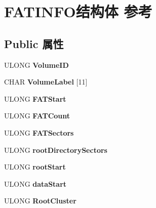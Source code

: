 \hypertarget{struct_f_a_t_i_n_f_o}{}\section{F\+A\+T\+I\+N\+F\+O结构体 参考}
\label{struct_f_a_t_i_n_f_o}
\subsection*{Public 属性}
\begin{DoxyCompactItemize}
\item 
\mbox{\label{struct_f_a_t_i_n_f_o_ad13a5ec5d042ddd8aab39deb6f18c90f}} 
U\+L\+O\+NG {\bfseries Volume\+ID}
\item 
\mbox{\label{struct_f_a_t_i_n_f_o_aa81b74b2d23f8b16c23ee38fb41481e0}} 
C\+H\+AR {\bfseries Volume\+Label} \mbox{[}11\mbox{]}
\item 
\mbox{\label{struct_f_a_t_i_n_f_o_afbcfedca0b6f28f06d243fc201efbf24}} 
U\+L\+O\+NG {\bfseries F\+A\+T\+Start}
\item 
\mbox{\label{struct_f_a_t_i_n_f_o_a7adff6d4f07c40417f29ceefcd79fc54}} 
U\+L\+O\+NG {\bfseries F\+A\+T\+Count}
\item 
\mbox{\label{struct_f_a_t_i_n_f_o_afcb7c6d3e68ed0bcffeab70e006b2ea9}} 
U\+L\+O\+NG {\bfseries F\+A\+T\+Sectors}
\item 
\mbox{\label{struct_f_a_t_i_n_f_o_a32ea8c8fa70e25c08cff36ddf145d7f7}} 
U\+L\+O\+NG {\bfseries root\+Directory\+Sectors}
\item 
\mbox{\label{struct_f_a_t_i_n_f_o_a8debb48b3bf79fb7ddcfab7a8993cc95}} 
U\+L\+O\+NG {\bfseries root\+Start}
\item 
\mbox{\label{struct_f_a_t_i_n_f_o_a070a3a3e6d7d64f5c0b676deaff8ee70}} 
U\+L\+O\+NG {\bfseries data\+Start}
\item 
\mbox{\label{struct_f_a_t_i_n_f_o_aa601416f45a928e3c3dfae40867541e6}} 
U\+L\+O\+NG {\bfseries Root\+Cluster}

\end{DoxyCompactItemize}
